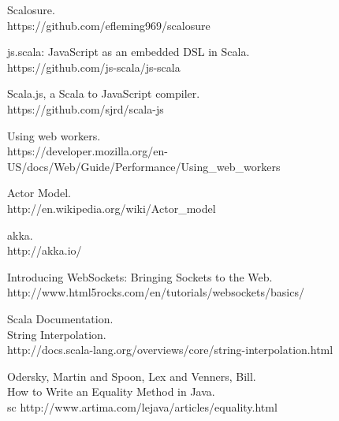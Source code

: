\begin{thebibliography}{99}
  Scalosure.\\
  https://github.com/efleming969/scalosure
	
  js.scala: JavaScript as an embedded DSL in Scala.\\
  https://github.com/js-scala/js-scala
	
  Scala.js, a Scala to JavaScript compiler.\\
  https://github.com/sjrd/scala-js
	
  Using web workers.\\
  https://developer.mozilla.org/en-US/docs/Web/Guide/Performance/Using\_web\_workers
	
  Actor Model.\\
  http://en.wikipedia.org/wiki/Actor\_model
	
	akka.\\
	http://akka.io/
	
  Introducing WebSockets: Bringing Sockets to the Web.\\
	http://www.html5rocks.com/en/tutorials/websockets/basics/
	
  Scala Documentation.\\
	String Interpolation.\\
	http://docs.scala-lang.org/overviews/core/string-interpolation.html
	
  {\sc Odersky,} Martin and {\sc Spoon,} Lex and {\sc Venners,} Bill.\\
  How to Write an Equality Method in Java.\\
	{sc}
	http://www.artima.com/lejava/articles/equality.html
	
\end{thebibliography}